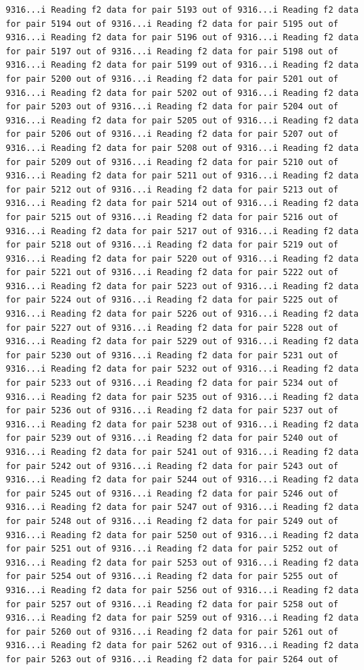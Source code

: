 \documentclass[
]{article}
\begin{document}
\begin{verbatim}
9316...i Reading f2 data for pair 5193 out of 9316...i Reading f2 data for pair 5194 out of 9316...i Reading f2 data for pair 5195 out of 9316...i Reading f2 data for pair 5196 out of 9316...i Reading f2 data for pair 5197 out of 9316...i Reading f2 data for pair 5198 out of 9316...i Reading f2 data for pair 5199 out of 9316...i Reading f2 data for pair 5200 out of 9316...i Reading f2 data for pair 5201 out of 9316...i Reading f2 data for pair 5202 out of 9316...i Reading f2 data for pair 5203 out of 9316...i Reading f2 data for pair 5204 out of 9316...i Reading f2 data for pair 5205 out of 9316...i Reading f2 data for pair 5206 out of 9316...i Reading f2 data for pair 5207 out of 9316...i Reading f2 data for pair 5208 out of 9316...i Reading f2 data for pair 5209 out of 9316...i Reading f2 data for pair 5210 out of 9316...i Reading f2 data for pair 5211 out of 9316...i Reading f2 data for pair 5212 out of 9316...i Reading f2 data for pair 5213 out of 9316...i Reading f2 data for pair 5214 out of 9316...i Reading f2 data for pair 5215 out of 9316...i Reading f2 data for pair 5216 out of 9316...i Reading f2 data for pair 5217 out of 9316...i Reading f2 data for pair 5218 out of 9316...i Reading f2 data for pair 5219 out of 9316...i Reading f2 data for pair 5220 out of 9316...i Reading f2 data for pair 5221 out of 9316...i Reading f2 data for pair 5222 out of 9316...i Reading f2 data for pair 5223 out of 9316...i Reading f2 data for pair 5224 out of 9316...i Reading f2 data for pair 5225 out of 9316...i Reading f2 data for pair 5226 out of 9316...i Reading f2 data for pair 5227 out of 9316...i Reading f2 data for pair 5228 out of 9316...i Reading f2 data for pair 5229 out of 9316...i Reading f2 data for pair 5230 out of 9316...i Reading f2 data for pair 5231 out of 9316...i Reading f2 data for pair 5232 out of 9316...i Reading f2 data for pair 5233 out of 9316...i Reading f2 data for pair 5234 out of 9316...i Reading f2 data for pair 5235 out of 9316...i Reading f2 data for pair 5236 out of 9316...i Reading f2 data for pair 5237 out of 9316...i Reading f2 data for pair 5238 out of 9316...i Reading f2 data for pair 5239 out of 9316...i Reading f2 data for pair 5240 out of 9316...i Reading f2 data for pair 5241 out of 9316...i Reading f2 data for pair 5242 out of 9316...i Reading f2 data for pair 5243 out of 9316...i Reading f2 data for pair 5244 out of 9316...i Reading f2 data for pair 5245 out of 9316...i Reading f2 data for pair 5246 out of 9316...i Reading f2 data for pair 5247 out of 9316...i Reading f2 data for pair 5248 out of 9316...i Reading f2 data for pair 5249 out of 9316...i Reading f2 data for pair 5250 out of 9316...i Reading f2 data for pair 5251 out of 9316...i Reading f2 data for pair 5252 out of 9316...i Reading f2 data for pair 5253 out of 9316...i Reading f2 data for pair 5254 out of 9316...i Reading f2 data for pair 5255 out of 9316...i Reading f2 data for pair 5256 out of 9316...i Reading f2 data for pair 5257 out of 9316...i Reading f2 data for pair 5258 out of 9316...i Reading f2 data for pair 5259 out of 9316...i Reading f2 data for pair 5260 out of 9316...i Reading f2 data for pair 5261 out of 9316...i Reading f2 data for pair 5262 out of 9316...i Reading f2 data for pair 5263 out of 9316...i Reading f2 data for pair 5264 out of 
\end{verbatim}
\end{document}

